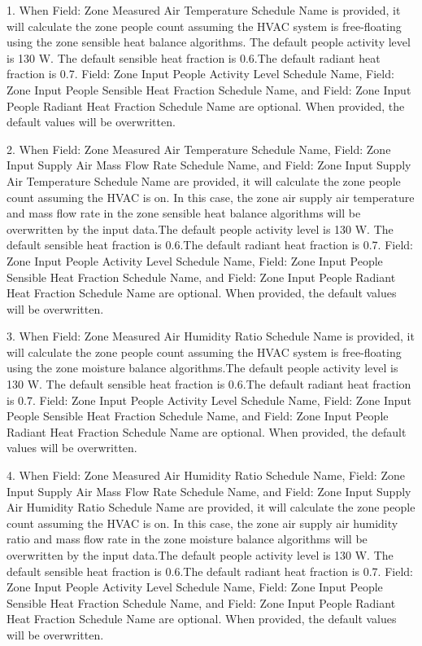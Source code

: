 1. When Field: Zone Measured Air Temperature Schedule Name is provided, it will calculate the zone people count assuming the HVAC system is free-floating using the zone sensible heat balance algorithms. The default people activity level is 130 W. The default sensible heat fraction is 0.6.The default radiant heat fraction is 0.7. Field: Zone Input People Activity Level Schedule Name, Field: Zone Input People Sensible Heat Fraction Schedule Name, and Field: Zone Input People Radiant Heat Fraction Schedule Name are optional. When provided, the default values will be overwritten.

2. When Field: Zone Measured Air Temperature Schedule Name, Field: Zone Input Supply Air Mass Flow Rate Schedule Name, and Field: Zone Input Supply Air Temperature Schedule Name are provided, it will calculate the zone people count assuming the HVAC is on. In this case, the zone air supply air temperature and mass flow rate in the zone sensible heat balance algorithms will be overwritten by the input data.The default people activity level is 130 W. The default sensible heat fraction is 0.6.The default radiant heat fraction is 0.7. Field: Zone Input People Activity Level Schedule Name, Field: Zone Input People Sensible Heat Fraction Schedule Name, and Field: Zone Input People Radiant Heat Fraction Schedule Name are optional. When provided, the default values will be overwritten.

3. When Field: Zone Measured Air Humidity Ratio Schedule Name is provided, it will calculate the zone people count assuming the HVAC system is free-floating using the zone moisture balance algorithms.The default people activity level is 130 W. The default sensible heat fraction is 0.6.The default radiant heat fraction is 0.7. Field: Zone Input People Activity Level Schedule Name, Field: Zone Input People Sensible Heat Fraction Schedule Name, and Field: Zone Input People Radiant Heat Fraction Schedule Name are optional. When provided, the default values will be overwritten.

4. When Field: Zone Measured Air Humidity Ratio Schedule Name, Field: Zone Input Supply Air Mass Flow Rate Schedule Name, and Field: Zone Input Supply Air Humidity Ratio Schedule Name are provided, it will calculate the zone people count assuming the HVAC is on. In this case, the zone air supply air humidity ratio and mass flow rate in the zone moisture balance algorithms will be overwritten by the input data.The default people activity level is 130 W. The default sensible heat fraction is 0.6.The default radiant heat fraction is 0.7. Field: Zone Input People Activity Level Schedule Name, Field: Zone Input People Sensible Heat Fraction Schedule Name, and Field: Zone Input People Radiant Heat Fraction Schedule Name are optional. When provided, the default values will be overwritten.

